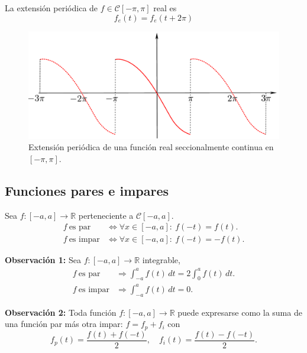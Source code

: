\begin{ejemplo}
La extensión periódica de $f \in \mathcal{C}[-\pi,\pi]$ real es
$$f_e(t) = f_e(t + 2\pi)$$

\begin{figure}[H]
    \centering
    \includegraphics[scale = 0.45]{Figuras/Periocidad.pdf}
    \caption{Extensión periódica de una función real seccionalmente continua en $[-\pi,\pi]$.}
\end{figure}
\end{ejemplo}

\subsection{Funciones pares e impares}
 
\begin{defi}
Sea $f: [-a,a] \longrightarrow \mathbb{R}$ perteneciente a $\mathcal{C}[-a,a]$.
\vspace{-0.1cm}
\begin{align*}
    f ~\mbox{es par} &\Leftrightarrow \forall x \in [-a,a] :~ f(-t) = f(t). \\
    f ~\mbox{es impar} &\Leftrightarrow \forall x \in [-a,a] :~ f(-t) = -f(t).
\end{align*}
\end{defi} 

\textbf{Observación 1:} Sea $f: [-a,a] \longrightarrow \mathbb{R}$ integrable,
\begin{align*}
    f ~\mbox{es par} &\Rightarrow \int_{-a}^a f(t) \,dt = 2 \int_0^a f(t) \,dt. \\
    f ~\mbox{es impar} &\Rightarrow \int_{-a}^a f(t) \,dt = 0.
\end{align*}

\textbf{Observación 2:} Toda función $f:[-a,a] \longrightarrow \mathbb{R}$ puede expresarse como la suma de una función par más otra impar: $f = f_p + f_i$ con 
$$f_p(t) = \frac{f(t) + f(-t)}{2}, \quad f_i(t) = \frac{f(t) - f(-t)}{2}.$$

